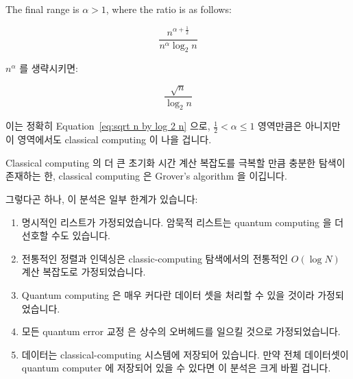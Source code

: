 The final range is $\alpha > 1$, where the ratio is as follows:
\fi

\begin{equation}
	\frac{n^{\alpha + \frac{1}{2}}}{n^\alpha \log_2 n}
\end{equation}

$n^\alpha$ 를 생략시키면:

\begin{equation}
	\frac{\sqrt n}{\log_2 n}
\end{equation}

이는 정확히
Equation~\ref{eq:sqrt n by log 2 n} 으로, $\frac{1}{2} < \alpha \leq 1$
영역만큼은 아니지만 이 영역에서도 classical computing 이 나을 겁니다.

Classical computing 의 더 큰 초기화 시간 계산 복잡도를 극복할 만큼 충분한
탐색이 존재하는 한, classical computing 은 Grover's algorithm 을 이깁니다.

그렇다곤 하나, 이 분석은 일부 한계가 있습니다:

\begin{enumerate}
\item	명시적인 리스트가 가정되었습니다.
	암묵적 리스트는 quantum computing 을 더 선호할 수도 있습니다.
\item	전통적인 정렬과 인덱싱은 classic-computing 탐색에서의 전통적인 $O(\log
	N)$ 계산 복잡도로 가정되었습니다.
\item	Quantum computing 은 매우 커다란 데이터 셋을 처리할 수 있을 것이라
	가정되었습니다.
\item	모든 quantum error 교정 은 상수의 오버헤드를 일으킬 것으로
	가정되었습니다.
\item	데이터는 classical-computing 시스템에 저장되어 있습니다.
	만약 전체 데이터셋이 quantum computer 에 저장되어 있을 수 있다면 이
	분석은 크게 바뀔 겁니다.

\end{enumerate}

